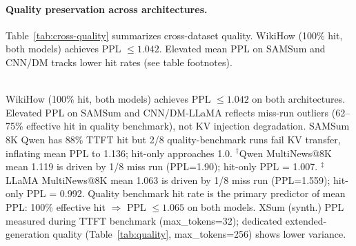 \documentclass[10pt,twocolumn]{article}
\begin{document}
\paragraph{Quality preservation across architectures.}
Table~\ref{tab:cross-quality} summarizes cross-dataset quality.
WikiHow (100\% hit, both models) achieves PPL ${\leq}1.042$.
Elevated mean PPL on SAMSum and CNN/DM tracks lower hit rates
(see table footnotes).

\begin{table}[t]
\centering
\caption{\textbf{Quality across datasets and models.}
PPL ratio $\approx 1.0$ means no degradation; elevated values on
MultiNews, CNN/DM, and SAMSum are driven by miss-runs (failed KV transfer),
not by KV injection quality. Both models tested on 5 datasets. $n{=}8$ per length.}
\label{tab:cross-quality}
\footnotesize
\setlength{\tabcolsep}{3pt}
\\[2pt]
{\footnotesize WikiHow (100\% hit, both models) achieves PPL $\leq 1.042$
on both architectures. Elevated PPL on SAMSum and CNN/DM-LLaMA reflects
miss-run outliers (62--75\% effective hit in quality benchmark), not KV injection
degradation. SAMSum 8K Qwen has 88\% TTFT hit but 2/8 quality-benchmark
runs fail KV transfer, inflating mean PPL to 1.136; hit-only approaches 1.0.
$^\dagger$Qwen MultiNews@8K mean 1.119 is driven by 1/8 miss run (PPL=1.90);
hit-only PPL = 1.007.
$^\ddagger$LLaMA MultiNews@8K mean 1.063 is driven by 1/8 miss run (PPL=1.559);
hit-only PPL = 0.992.
Quality benchmark hit rate is the primary predictor of mean PPL:
100\% effective hit $\Rightarrow$ PPL $\leq 1.065$ on both models.
XSum (synth.) PPL measured during TTFT benchmark (max\_tokens=32);
dedicated extended-generation quality (Table~\ref{tab:quality}, max\_tokens=256)
shows lower variance.}
\end{table}
\end{document}
